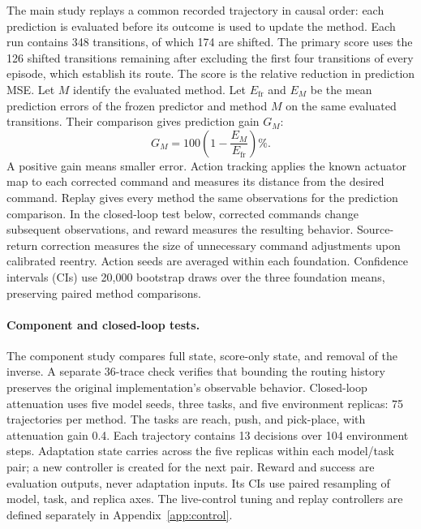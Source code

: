 The main study replays a common recorded trajectory in causal order: each
prediction is evaluated before its outcome is used to update the method.
Each run contains 348 transitions, of which 174 are shifted. The primary
score uses the 126 shifted transitions remaining after excluding the first
four transitions of every episode, which establish its route.
The score is the relative reduction in prediction MSE. Let $M$ identify the
evaluated method. Let $E_{\mathrm{fr}}$ and $E_M$ be the mean prediction errors
of the frozen predictor and method $M$ on the same evaluated transitions.
Their comparison gives prediction gain $G_M$:
\begin{equation}
 G_M=100\left(1-\frac{E_M}{E_{\mathrm{fr}}}\right)\%.
 \label{eq:gain}
\end{equation}
A positive gain means smaller error. Action tracking applies the known actuator
map to each corrected command and measures its distance from the desired
command. Replay gives every method the same observations for the prediction
comparison. In the closed-loop test below, corrected commands change subsequent
observations, and reward measures the resulting behavior. Source-return correction measures
the size of unnecessary command adjustments upon calibrated reentry. Action
seeds are averaged within each foundation. Confidence intervals (CIs) use
20,000 bootstrap draws over the three foundation means, preserving paired
method comparisons.

\paragraph{Component and closed-loop tests.}
The component study compares full state, score-only state, and removal of the
inverse. A separate 36-trace check verifies that bounding the routing history
preserves the original implementation's observable behavior. Closed-loop
attenuation uses five model seeds, three tasks, and five environment replicas:
75 trajectories per method. The tasks are reach, push, and pick-place, with
attenuation gain 0.4. Each trajectory contains 13 decisions over 104 environment
steps. Adaptation state carries across the five replicas within each model/task
pair; a new controller is created for the next pair. Reward and success are
evaluation outputs, never adaptation inputs. Its CIs use paired resampling
of model, task, and replica axes. The live-control tuning and replay controllers
are defined separately in Appendix~\ref{app:control}.

